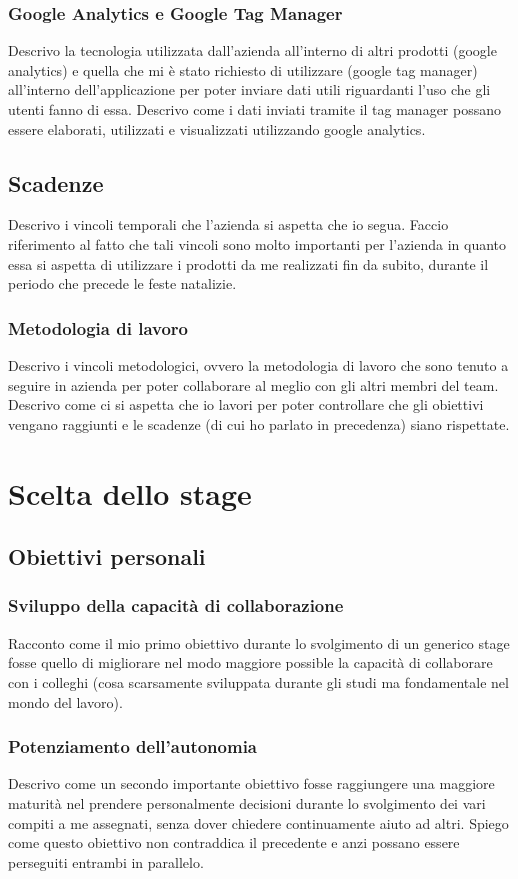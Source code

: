			\subsubsection{Google Analytics e Google Tag Manager}
				Descrivo la tecnologia utilizzata dall'azienda all'interno di altri prodotti (google analytics) e quella che mi è
				stato richiesto di utilizzare (google tag manager) all'interno dell'applicazione per poter inviare dati utili
				riguardanti l'uso che gli utenti fanno di essa. Descrivo come i dati inviati tramite il tag manager possano essere
				elaborati, utilizzati e visualizzati utilizzando google analytics.
		\subsection{Scadenze}
			Descrivo i vincoli temporali che l'azienda si aspetta che io segua. Faccio riferimento al fatto che tali vincoli sono molto
			importanti per l'azienda in quanto essa si aspetta di utilizzare i prodotti da me realizzati fin da subito, durante il
			periodo che precede le feste natalizie.
		\subsubsection{Metodologia di lavoro}
			Descrivo i vincoli metodologici, ovvero la metodologia di lavoro che sono tenuto a seguire in azienda per poter collaborare
			al meglio con gli altri membri del team. Descrivo come ci si aspetta che io lavori per poter controllare che gli obiettivi
			vengano raggiunti e le scadenze (di cui ho parlato in precedenza) siano rispettate.
	\section{Scelta dello stage}
		\subsection{Obiettivi personali}
			\subsubsection{Sviluppo della capacità di collaborazione}
				Racconto come il mio primo obiettivo durante lo svolgimento di un generico stage fosse quello di migliorare nel modo
				maggiore possible la capacità di collaborare con i colleghi (cosa scarsamente sviluppata durante gli studi ma
				fondamentale nel mondo del lavoro).
			\subsubsection{Potenziamento dell'autonomia}
				Descrivo come un secondo importante obiettivo fosse raggiungere una maggiore maturità nel prendere personalmente
				decisioni durante lo svolgimento dei vari compiti a me assegnati, senza dover chiedere continuamente aiuto ad altri.
				Spiego come questo obiettivo non contraddica il precedente e anzi possano essere perseguiti entrambi in parallelo.

